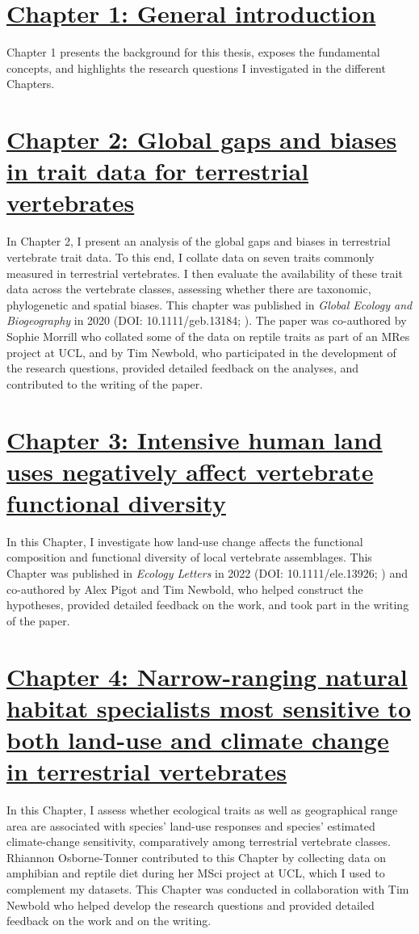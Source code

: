 
\section*{\hyperref[sec:1]{Chapter 1: General introduction}}
Chapter 1 presents the background for this thesis, exposes the fundamental concepts, and highlights the research questions I investigated in the different Chapters.

\section*{\hyperref[sec:2]{Chapter 2: Global gaps and biases in trait data for terrestrial vertebrates}}
In Chapter 2, I present an analysis of the global gaps and biases in terrestrial vertebrate trait data. To this end, I collate data on seven traits commonly measured in terrestrial vertebrates. I then evaluate the availability of these trait data across the vertebrate classes, assessing whether there are taxonomic, phylogenetic and spatial biases. This chapter was published in \textit{Global Ecology and Biogeography} in 2020 (DOI: 10.1111/geb.13184; \citet{Etard2020}). The paper was co-authored by Sophie Morrill who collated some of the data on reptile traits as part of an MRes project at UCL, and by Tim Newbold, who participated in the development of the research questions, provided detailed feedback on the analyses, and contributed to the writing of the paper. 

\section*{\hyperref[sec:3]{Chapter 3: Intensive human land uses negatively affect vertebrate functional diversity}}
In this Chapter, I investigate how land-use change affects the functional composition and functional diversity  of local vertebrate assemblages. This Chapter was published in \textit{Ecology Letters} in 2022  (DOI: 10.1111/ele.13926; \citet{Etard2022}) and co-authored by Alex Pigot and Tim Newbold, who helped construct the hypotheses, provided detailed feedback on the work, and took part in the writing of the paper.

\section*{\hyperref[sec:4]{Chapter 4: Narrow-ranging natural habitat specialists most sensitive to both land-use and climate change in terrestrial vertebrates}}
In this Chapter, I assess whether ecological traits as well as geographical range area are associated with species' land-use responses and species' estimated climate-change sensitivity, comparatively among terrestrial vertebrate classes. Rhiannon Osborne-Tonner contributed to this Chapter by collecting data on amphibian and reptile diet during her MSci project at UCL, which I used to complement my datasets. This Chapter was conducted in collaboration with Tim Newbold who helped develop the research questions and provided detailed feedback on the work and on the writing.  %

